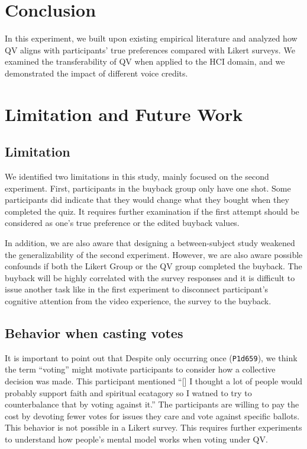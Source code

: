 \section{Conclusion} \label{conclusion}
In this experiment, we built upon existing empirical literature
and analyzed how QV aligns with participants' true preferences compared with Likert surveys.
We examined the transferability of QV when applied to the HCI domain, and we demonstrated the impact of different voice credits.

\section{Limitation and Future Work} \label{future}

\subsection{Limitation}
We identified two limitations in this study, 
mainly focused on the second experiment.
First, participants in the buyback group
only have one shot.
Some participants did indicate that
they would change what they bought
when they completed the quiz.
It requires further examination
if the first attempt should be considered as one's true preference
or the edited buyback values.

In addition, we are also aware that
designing a between-subject study 
weakened the generalizability 
of the second experiment.
However, we are also aware possible confounds
if both the Likert Group or the QV group completed the buyback.
The buyback will be highly correlated with the survey responses
and it is difficult to issue another task
like in the first experiment
to disconnect participant's cognitive attention
from the video experience, the survey to the buyback.

\subsection{Behavior when casting votes} %
It is important to point out that Despite only occurring once (\texttt{P1d659}), we think the term ``voting'' might motivate participants to consider how a collective decision was made.
This participant mentioned ``[\textellipsis] I thought a lot of people would probably support faith and spiritual ecatagory  so I watned to try to counterbalance that by voting against it.'' The participants are willing to pay the cost by devoting fewer votes for issues they care and vote against specific ballots. This behavior is not possible in a Likert survey. This requires further experiments to understand how people's mental model works when voting under QV. \par 

